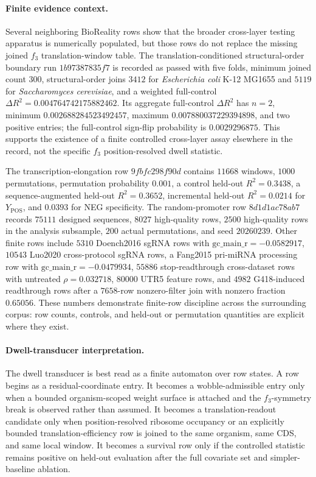 \paragraph{Finite evidence context.} Several neighboring BioReality rows show that the broader cross-layer testing apparatus is numerically populated, but those rows do not replace the missing joined $f_3$ translation-window table. The translation-conditioned structural-order boundary run $1b97387835f7$ is recorded as passed with five folds, minimum joined count $300$, structural-order joins $3412$ for \emph{Escherichia coli} K-12 MG1655 and $5119$ for \emph{Saccharomyces cerevisiae}, and a weighted full-control $\Delta R^2=0.004764742175882462$. Its aggregate full-control $\Delta R^2$ has $n=2$, minimum $0.002688284523492457$, maximum $0.007880037229394898$, and two positive entries; the full-control sign-flip probability is $0.0029296875$. This supports the existence of a finite controlled cross-layer assay elsewhere in the record, not the specific $f_3$ position-resolved dwell statistic.

The transcription-elongation row $9fbfc298f90d$ contains $11668$ windows, $1000$ permutations, permutation probability $0.001$, a control held-out $R^2=0.3438$, a sequence-augmented held-out $R^2=0.3652$, incremental held-out $R^2=0.0214$ for $Y_{\mathrm{POS}}$, and $0.0393$ for NEG specificity. The random-promoter row $8d1d1ac78ab7$ records $75111$ designed sequences, $8027$ high-quality rows, $2500$ high-quality rows in the analysis subsample, $200$ actual permutations, and seed $20260239$. Other finite rows include $5310$ Doench2016 sgRNA rows with $\mathrm{gc\_main\_r}=-0.0582917$, $10543$ Luo2020 cross-protocol sgRNA rows, a Fang2015 pri-miRNA processing row with $\mathrm{gc\_main\_r}=-0.0479934$, $55886$ stop-readthrough cross-dataset rows with untreated $\rho=0.032718$, $80000$ UTR5 feature rows, and $4982$ G418-induced readthrough rows after a $7658$-row nonzero-filter join with nonzero fraction $0.65056$. These numbers demonstrate finite-row discipline across the surrounding corpus: row counts, controls, and held-out or permutation quantities are explicit where they exist.

\paragraph{Dwell-transducer interpretation.} The dwell transducer is best read as a finite automaton over row states. A row begins as a residual-coordinate entry. It becomes a wobble-admissible entry only when a bounded organism-scoped weight surface is attached and the $f_3$-symmetry break is observed rather than assumed. It becomes a translation-readout candidate only when position-resolved ribosome occupancy or an explicitly bounded translation-efficiency row is joined to the same organism, same CDS, and same local window. It becomes a survival row only if the controlled statistic remains positive on held-out evaluation after the full covariate set and simpler-baseline ablation.

